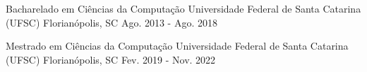 

\begin{cventries}

  \cventry
    {Bacharelado em Ciências da Computação} %
    {Universidade Federal de Santa Catarina (UFSC)} %
    {Florianópolis, SC} %
    {Ago. 2013 - Ago. 2018} %
    {}

   \cventry
     {Mestrado em Ciências da Computação} %
     {Universidade Federal de Santa Catarina (UFSC)} %
     {Florianópolis, SC} %
     {Fev. 2019 - Nov. 2022} %
     {}

\end{cventries}
